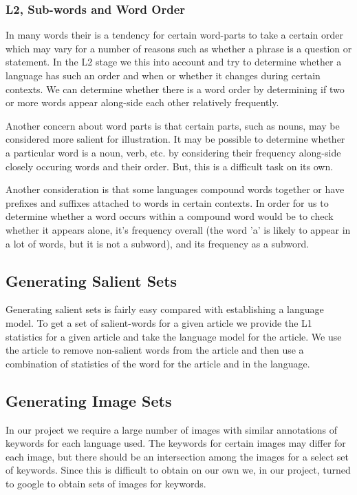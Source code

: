 \documentclass[12pt]{article}
\begin{document}
\subsubsection{L2, Sub-words and Word Order}
In many words their is a tendency for certain word-parts to take a certain order which may vary for a number of reasons such as whether a phrase is a question or statement. In the L2 stage we this into account and try to determine whether a language has such an order and when or whether it changes during certain contexts. We can determine whether there is a word order by determining if two or more words appear along-side each other relatively frequently.

Another concern about word parts is that certain parts, such as nouns, may be considered more salient for illustration. It may be possible to determine whether a particular word is a noun, verb, etc.
by considering their frequency along-side closely occuring words and their order. But, this is a difficult task on its own.

Another consideration is that some languages compound words together or have prefixes and suffixes attached to words in certain contexts. 
In order for us to determine whether a word occurs within a compound word would be to check whether it appears alone, 
it's frequency overall (the word 'a' is likely to appear in a lot of words, but it is not a subword), and its frequency as a subword.

\subsection{Generating Salient Sets}
Generating salient sets is fairly easy compared with establishing a language model. To get a set of salient-words for a given article we provide the L1 statistics for a given article and take the language model for the article. We use the article to remove non-salient words from the article and then use a combination of statistics of the word for the article and in the language.

\subsection{Generating Image Sets}
In our project we require a large number of images with similar annotations of keywords for each language used. The keywords for certain images may differ for each image, but there should be an intersection among the images for a select set of keywords. Since this is difficult to obtain on our own we, in our project, turned to google to obtain sets of images for keywords.
\end{document}
